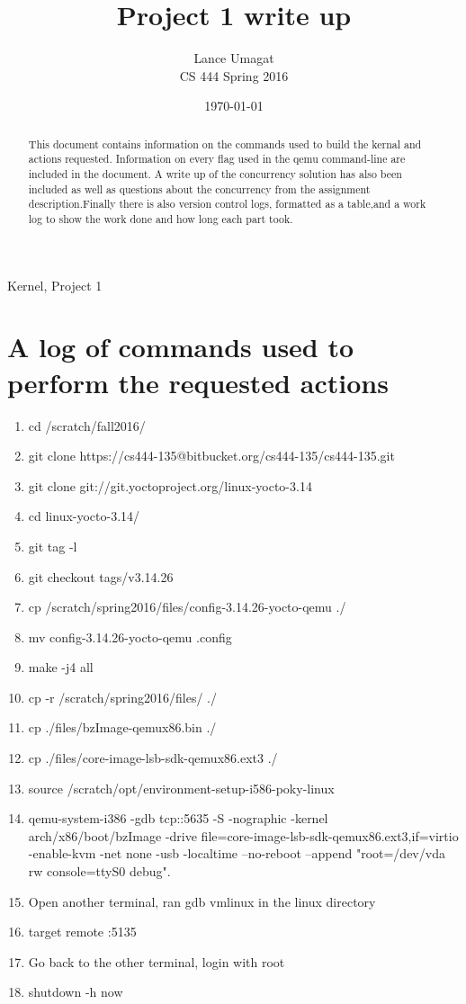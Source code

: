 \documentclass[draftclsnofoot,onecolumn,letterpaper,10pt,titlepage]{IEEEtran}
\begin{document}
\title{Project 1 write up}

\author{Lance Umagat \\
CS 444 Spring 2016}

\begin{titlepage}
\maketitle
\date{\today}

\begin{abstract}
This document contains information on the commands used to build the kernal and actions requested. Information on every flag used in the qemu command-line are included in the document. A write up of the concurrency solution has also been included as well as questions about the concurrency from the assignment description.Finally there is also version control logs, formatted as a table,and a work log to show the work done and how long each part took.  
\end{abstract}

\begin{IEEEkeywords}
Kernel, Project 1
\end{IEEEkeywords}
\end{titlepage}

\section{A log of commands used to perform the requested actions}
\begin{enumerate}
\item cd /scratch/fall2016/
\item git clone https://cs444-135@bitbucket.org/cs444-135/cs444-135.git
\item git clone git://git.yoctoproject.org/linux-yocto-3.14
\item cd linux-yocto-3.14/
\item git tag -l
\item git checkout tags/v3.14.26
\item cp /scratch/spring2016/files/config-3.14.26-yocto-qemu ./
\item mv config-3.14.26-yocto-qemu .config
\item make -j4 all
\item cp -r /scratch/spring2016/files/ ./
\item cp ./files/bzImage-qemux86.bin ./
\item cp ./files/core-image-lsb-sdk-qemux86.ext3 ./
\item source /scratch/opt/environment-setup-i586-poky-linux
\item qemu-system-i386 -gdb tcp::5635 -S -nographic -kernel arch/x86/boot/bzImage -drive file=core-image-lsb-sdk-qemux86.ext3,if=virtio -enable-kvm -net none -usb -localtime --no-reboot --append "root=/dev/vda rw console=ttyS0 debug".
\item Open another terminal, ran gdb vmlinux in the linux directory
\item target remote :5135
\item Go back to the other terminal, login with root  
\item shutdown -h now 
\end{enumerate}
\end{document}
